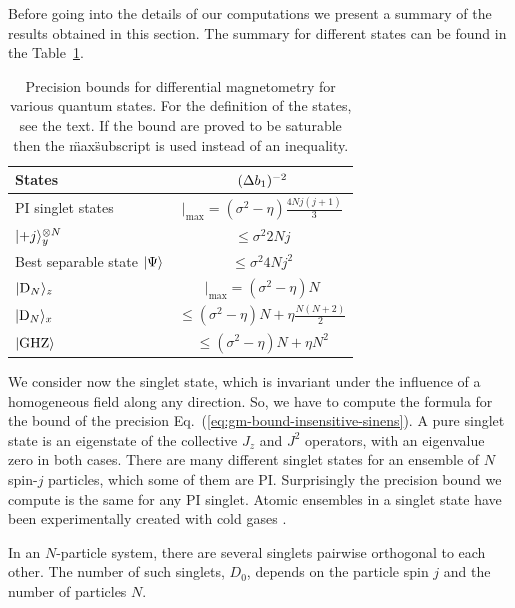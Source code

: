 Before going into the details of our computations we present a summary of the results obtained in this section.
The summary for different states can be found in the Table~\ref{tab:compare all the states}.
\begin{table}
  \begin{center}
  \begin{tabular}{|l|c|}
    \hline
    States & $(\Delta b_1 )^{-2}$ \\
    \hline
    PI singlet states & $ |_{\max} = (\sigma^2-\eta) \frac{4Nj(j+1)}{3}$ \\
    \hline
    $\vert{+j}\rangle_{y}^{\otimes N}$ & $\leqslant \sigma^2 2Nj$ \\
    \hline
    Best separable state $\vert{\Psi}\rangle$ & $\leqslant \sigma^2 4N j^2$ \\
    \hline
    $\vert{\ensuremath{\textnormal{D}_{N}}}\rangle_{z}$ & $ |_{\max}=(\sigma^2-\eta) N$\\
    \hline
    $\vert{\ensuremath{\textnormal{D}_{N}}}\rangle_{x}$ & $ \leqslant (\sigma^2 -\eta) N + \eta \frac{N(N+2)}{2}$ \\
    \hline
    $\vert{\textnormal{GHZ}}\rangle$ & $\leqslant (\sigma^2 - \eta) N  + \eta N^2$ \\
    \hline
  \end{tabular}
  \end{center}
\caption[Bounds on the precision for different internal states for gradient magnetometry.]{Precision bounds for  differential magnetometry for various quantum states.
For the definition of the states, see the text.
If the bound are proved to be saturable then
the \"max\" subscript is used instead of an inequality.}
\label{tab:compare all the states}
\end{table}


We consider now the singlet state, which is invariant under the influence
of a homogeneous field along any direction.
So, we have to compute the formula for the bound of the precision Eq.~(\ref{eq:gm-bound-insensitive-sinens}).
A pure singlet state is an eigenstate of the collective $J_z$ and $J^2$
operators, with an eigenvalue zero in both cases.
There are many different singlet states for an ensemble of $N$
spin-$j$ particles, which some of them are PI.
Surprisingly the precision bound we compute is the same
for any PI singlet.
Atomic ensembles in a singlet state have been experimentally
created with cold gases \cite{Toth2010, Behbood2014}.

In an $N$-particle system, there are several singlets pairwise orthogonal to each other.
The number of such singlets, $D_0$, depends on the particle spin $j$ and the number of particles $N$.

